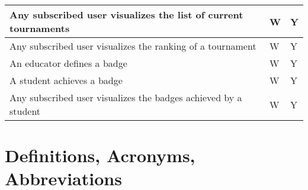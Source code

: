 \begin{center}
\begin{longtable}{|p{8.7cm}|p{3cm}|p{3cm}|}
        Any subscribed user visualizes the list of current tournaments                                                                        & W                      & Y               \\ \hline
        Any subscribed user visualizes the ranking of a tournament                                                                            & W                      & Y               \\ \hline
        An educator defines a badge                                                                                                           & W                      & Y               \\ \hline
        A student achieves a badge                                                                                                            & W                      & Y               \\ \hline
        Any subscribed user visualizes the badges achieved by a student                                                                       & W                      & Y               \\ \hline
    \end{longtable}
\end{center}


\section{Definitions, Acronyms, Abbreviations}

